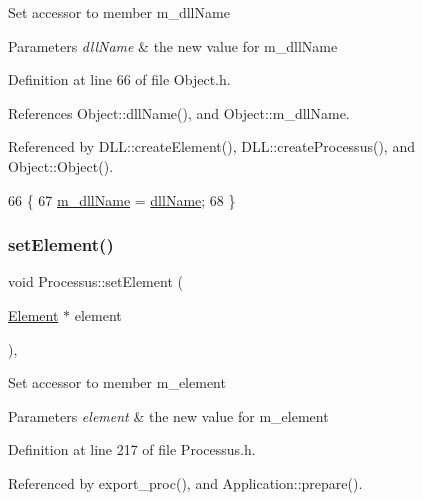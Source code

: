 Set accessor to member m\+\_\+dll\+Name 
\begin{DoxyParams}{Parameters}
{\em dll\+Name} & the new value for m\+\_\+dll\+Name \\
\hline
\end{DoxyParams}


Definition at line 66 of file Object.\+h.



References Object\+::dll\+Name(), and Object\+::m\+\_\+dll\+Name.



Referenced by D\+L\+L\+::create\+Element(), D\+L\+L\+::create\+Processus(), and Object\+::\+Object().


\begin{DoxyCode}
66                                       \{
67     \hyperlink{classObject_a01afbeacebb8db6831559972ec362eb3}{m\_dllName} = \hyperlink{classObject_a2e3947f2870094c332d7454117f3ec63}{dllName};
68   \}
\end{DoxyCode}
\mbox{\label{classProcessus_a8ddef94227d83d9dae2cd49aebc33353}} 
\subsubsection{\texorpdfstring{set\+Element()}{setElement()}}
{\footnotesize\ttfamily void Processus\+::set\+Element (\begin{DoxyParamCaption}\item[{\hyperlink{classElement}{Element} $\ast$}]{element }\end{DoxyParamCaption})\hspace{0.3cm}{\ttfamily [inline]}, {\ttfamily [inherited]}}

Set accessor to member m\+\_\+element 
\begin{DoxyParams}{Parameters}
{\em element} & the new value for m\+\_\+element \\
\hline
\end{DoxyParams}


Definition at line 217 of file Processus.\+h.



Referenced by export\+\_\+proc(), and Application\+::prepare().


